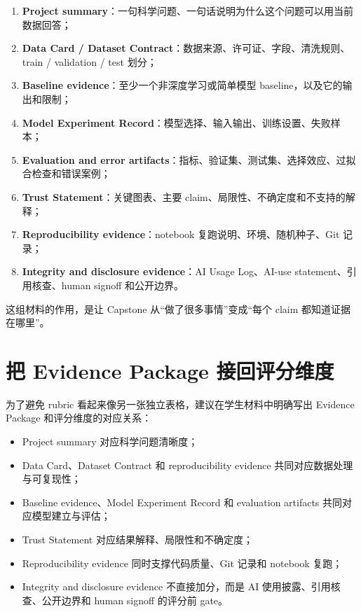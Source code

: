 \begin{enumerate}
    \item \textbf{Project summary}：一句科学问题、一句话说明为什么这个问题可以用当前数据回答；
    \item \textbf{Data Card / Dataset Contract}：数据来源、许可证、字段、清洗规则、train / validation / test 划分；
    \item \textbf{Baseline evidence}：至少一个非深度学习或简单模型 baseline，以及它的输出和限制；
    \item \textbf{Model Experiment Record}：模型选择、输入输出、训练设置、失败样本；
    \item \textbf{Evaluation and error artifacts}：指标、验证集、测试集、选择效应、过拟合检查和错误案例；
    \item \textbf{Trust Statement}：关键图表、主要 claim、局限性、不确定度和不支持的解释；
    \item \textbf{Reproducibility evidence}：notebook 复跑说明、环境、随机种子、Git 记录；
    \item \textbf{Integrity and disclosure evidence}：AI Usage Log、AI-use statement、引用核查、human signoff 和公开边界。
\end{enumerate}

这组材料的作用，是让 Capstone 从“做了很多事情”变成“每个 claim 都知道证据在哪里”。

\section{把 Evidence Package 接回评分维度}

为了避免 rubric 看起来像另一张独立表格，建议在学生材料中明确写出 Evidence Package 和评分维度的对应关系：

\begin{itemize}
    \item Project summary 对应科学问题清晰度；
    \item Data Card、Dataset Contract 和 reproducibility evidence 共同对应数据处理与可复现性；
    \item Baseline evidence、Model Experiment Record 和 evaluation artifacts 共同对应模型建立与评估；
    \item Trust Statement 对应结果解释、局限性和不确定度；
    \item Reproducibility evidence 同时支撑代码质量、Git 记录和 notebook 复跑；
    \item Integrity and disclosure evidence 不直接加分，而是 AI 使用披露、引用核查、公开边界和 human signoff 的评分前 gate。
\end{itemize}

